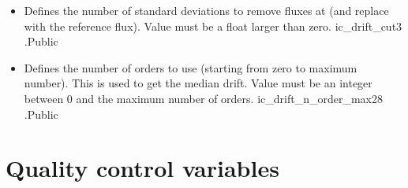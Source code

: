 \begin{itemize}
\item {}
{Defines the number of standard deviations to remove fluxes at (and replace with the reference flux). Value must be a float larger than zero.}
{ic\_drift\_cut}{3}
{\calDRIFTRAW}{\constantsfile}{\calDRIFTRAW.\progMAIN}{Public}


\item {}
{Defines the number of orders to use (starting from zero to maximum number). This is used to get the median drift. Value must be an integer between 0 and the maximum number of orders.}
{ic\_drift\_n\_order\_max}{28}
{\calDRIFTRAW}{\constantsfile}{\calDRIFTRAW.\progMAIN}{Public}


\end{itemize}


\clearpage
\newpage
\section{Quality control variables}
\label{ch:variables:qualitycontrol}

